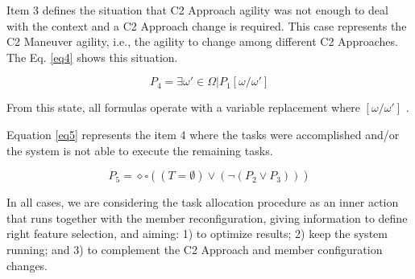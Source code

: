 
Item 3 defines the situation that C2 Approach agility was not enough to deal with the context and a C2 Approach change is required. This case represents the C2 Maneuver agility, i.e., the agility to change among different C2 Approaches. The Eq. \eqref{eq4} shows this situation. 

\begin{equation}
\label{eq4}
 P_4 = \exists \omega' \in \Omega | P_1[\omega / \omega']
\end{equation}

From this state, all formulas operate with a variable replacement where $[\omega / \omega']$ .

Equation \eqref{eq5} represents the item 4 where the tasks were accomplished and/or the system is not able to execute the remaining tasks.

\begin{equation}
\label{eq5}
 P_5 = \diamond \square ((T = \emptyset) \lor (\neg (P_2 \lor P_3)))
\end{equation}

In all cases, we are considering the task allocation procedure as an inner action that runs together with the member reconfiguration, giving information to define right feature selection, and aiming: 1) to optimize results; 2) keep the system running; and 3) to complement the C2 Approach and member configuration changes. 
